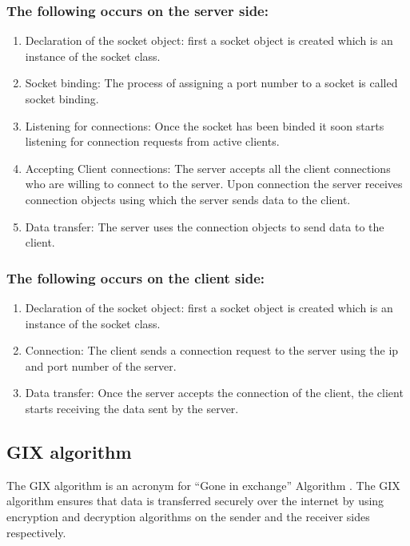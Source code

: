 \subsubsection*{The following occurs on the server side:} 
\begin{enumerate}[1.]
\item Declaration of the socket object: first a socket object is created which is an \\instance of the socket class.
\item Socket binding: The process of assigning a port number to a socket is called socket binding.  
\item Listening for connections: Once the socket has been binded it soon starts listening for connection requests from active clients. 
\item Accepting Client connections: The server accepts all the client connections who are willing to connect to the server. Upon connection the server receives \\connection objects using which the server sends data to the client.
\item Data transfer: The server uses the connection objects to send data to the client.
\end{enumerate}
\subsubsection*{The following occurs on the client side:}
\begin{enumerate}[1.]
\item Declaration of the socket object: first a socket object is created which is an \\instance of the socket class.
\item Connection: The client sends a connection request to the server using the ip and port number of the server. 
\item Data transfer: Once the server accepts the connection of the client, the client starts receiving the data sent by the server.
\end{enumerate}
\subsection{GIX algorithm}
The GIX algorithm is an acronym for “Gone in exchange” Algorithm . The GIX algorithm ensures that data is transferred securely over the internet by using \\encryption and decryption algorithms on the sender and the receiver sides \\respectively.
